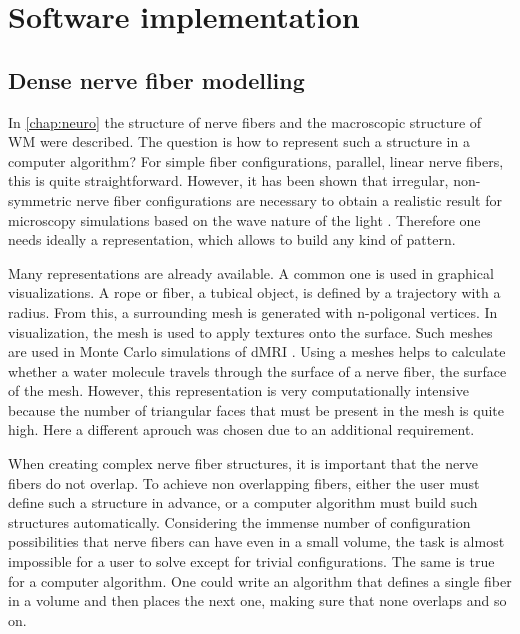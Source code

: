 \newpage\null\thispagestyle{empty}\newpage
\clearpage{\thispagestyle{empty}\cleardoublepage}
\part{Software implementation}
\parttoc
% 
% 
% 
\setcounter{chapter}{4}
\chapter{Dense nerve fiber modelling}
\label{chap:sof:modelling}
% 
In \cref{chap:neuro} the structure of nerve fibers and the macroscopic structure of \ac{WM} were described.
The question is how to represent such a structure in a computer algorithm?
For simple fiber configurations, \eg{} parallel, linear nerve fibers, this is quite straightforward.
However, it has been shown that irregular, non-symmetric nerve fiber configurations are necessary to obtain a realistic result for microscopy simulations based on the wave nature of the light \cite{MenzelDissertation}.
Therefore one needs ideally a representation, which allows to build any kind of pattern.
\par
%
Many representations are already available.
A common one is used in graphical visualizations.
A rope or fiber, \ie{} a tubical object, is defined by a trajectory with a radius.
From this, a surrounding mesh is generated with n-poligonal vertices.
In visualization, the mesh is used to apply textures onto the surface.
Such meshes are \eg{} used in Monte Carlo simulations of \ac{dMRI} \cite{Ginsburger2019,ginsburgerDis2019}.
Using a meshes helps to calculate whether a water molecule travels through the surface of a nerve fiber, \ie{} the surface of the mesh.
However, this representation is very computationally intensive because the number of triangular faces that must be present in the mesh is quite high.
Here a different aprouch was chosen due to an additional requirement.
\par
%
When creating complex nerve fiber structures, it is important that the nerve fibers do not overlap.
To achieve non overlapping fibers, either the user must define such a structure in advance, or a computer algorithm must build such structures automatically.
Considering the immense number of configuration possibilities that nerve fibers can have even in a small volume, the task is almost impossible for a user to solve except for trivial configurations.
The same is true for a computer algorithm.
One could write an algorithm that defines a single fiber in a volume and then places the next one, making sure that none overlaps and so on.
